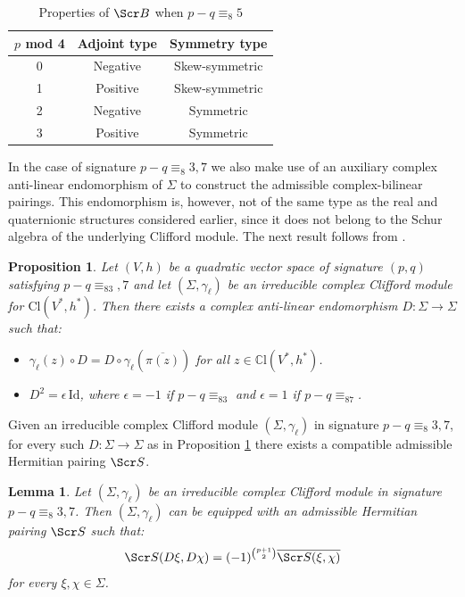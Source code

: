 \documentclass[10pt,a4paper,twoside,reqno]{amsart}
\theoremstyle{plain}
\newtheorem{prop}[thm]{Proposition}
\newtheorem{lemma}[thm]{Lemma}
\theoremstyle{definition}
\theoremstyle{remark}
\def\C{\mathbb{C}}
\def\Id{\mathrm{Id}}
\def\scB{\Scr B}
\def\scS{\Scr S}
\def\Cl{\mathrm{Cl}}
\begin{document}
\begin{table}
\centering
\caption{Properties of $\scB$ when $p-q\equiv_8 5$}
\label{tab:symmetry_parity5}
\renewcommand{\arraystretch}{1.3} %
\begin{tabular}{|c|c|c|}
\hline
\textbf{$p$ mod 4} & \textbf{Adjoint type} & \textbf{Symmetry type} \\ \hline
0 & Negative & Skew-symmetric \\ \hline
1 & Positive & Skew-symmetric \\ \hline
2 & Negative & Symmetric \\ \hline
3 & Positive & Symmetric \\ \hline
\end{tabular}
\end{table}

\noindent
In the case of signature $p-q\equiv_8 3,7$ we also make use of an auxiliary complex anti-linear endomorphism of $\Sigma$ to construct the admissible complex-bilinear pairings. This endomorphism is, however, not of the same type as the real and quaternionic structures considered earlier, since it does not belong to the Schur algebra of the underlying Clifford module. The next result follows from \cite[Proposition 4.4]{LS22_complex_type}.

\begin{prop}
\label{prop:D_endomorphism}
Let $(V,h)$ be a quadratic vector space of signature $(p,q)$ satisfying $p-q\equiv_83,7$ and let $(\Sigma,\gamma_\ell)$ be an irreducible complex Clifford module for $\Cl(V^*,h^*)$. Then there exists a complex anti-linear endomorphism $D\colon \Sigma \to \Sigma$ such that: \begin{itemize}
\item $\gamma_\ell(z)\circ D=D\circ\gamma_\ell(\overline{\pi(z)})$ for all $z\in\C\mathrm{l}(V^*,h^*)$.
\item $D^2=\epsilon\,\Id$, where $\epsilon=-1$ if $p-q\equiv_83$ and $\epsilon = 1$ if $p-q\equiv_87$.
\end{itemize}
\end{prop}

\noindent
Given an irreducible complex Clifford module $(\Sigma,\gamma_\ell)$ in signature $p-q \equiv_8 3,7$, for every such $D\colon \Sigma \to \Sigma$ as in Proposition \ref{prop:D_endomorphism} there exists a compatible admissible Hermitian pairing $\scS$.

\begin{lemma}
\label{lemma:compatible_admissible_pairingsD}
Let $(\Sigma,\gamma_\ell)$ be an irreducible complex Clifford module in signature $p-q \equiv_8 3,7$. Then $(\Sigma,\gamma_\ell)$ can be equipped with an admissible Hermitian pairing $\scS$ such that:
\begin{equation*}
\scS(D \xi , D \chi)=(-1)^{\binom{p+1}{2}}\overline{\scS(\xi,\chi)} 
\end{equation*}
 for every $\xi , \chi \in \Sigma$.
\end{lemma}
\end{document}
